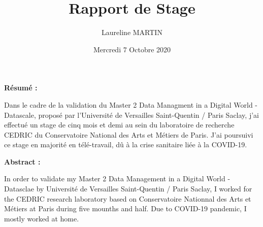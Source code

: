 \documentclass{article}
\title{Rapport de Stage}
\author{Laureline MARTIN}
\date{Mercredi 7 Octobre 2020}
\begin{document}
\maketitle
\vspace*{10cm}
\begin{center}
	\textbf{Résumé :}
\end{center}
\hspace*{0.4cm}
Dans le cadre de la validation du Master 2 Data Managment in a Digital World - Datascale, proposé par l'Université de Versailles Saint-Quentin / Paris Saclay, j'ai effectué un stage de cinq mois et demi au sein du laboratoire de recherche CEDRIC du Conservatoire National des Arts et Métiers de Paris.
J'ai poursuivi ce stage en majorité en télé-travail, dû à la crise sanitaire liée à la COVID-19.
\bigskip\newline
\begin{center}
	\textbf{Abstract :}
\end{center}
\hspace*{0.4cm}
In order to validate my Master 2 Data Management in a Digital World - Datasclae by Université de Versailles Saint-Quentin / Paris Saclay, I worked for the CEDRIC research laboratory based on Conservatoire Nationnal des Arts et Métiers at Paris during five mounths and half.
Due to COVID-19 pandemic, I mostly worked at home.


\newpage
\renewcommand{\contentsname}{Table des matières}\tableofcontents

\newpage
\end{document}
